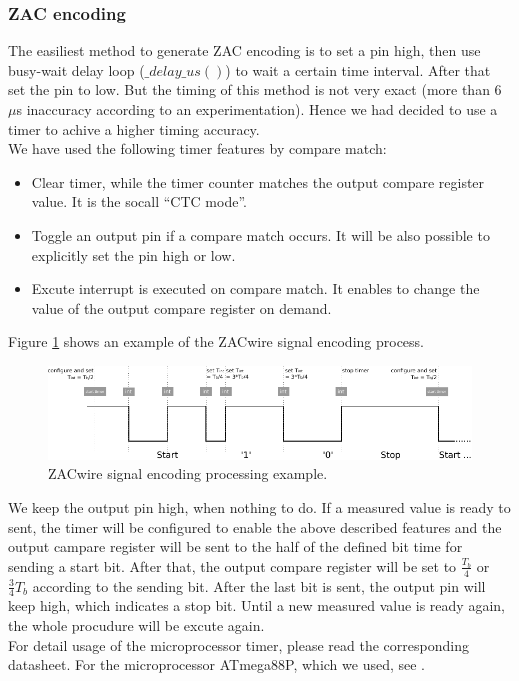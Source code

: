 \documentclass[a4paper]{scrreprt}
\begin{document}
\subsubsection{ZAC encoding}
The easiliest method to generate ZAC encoding is to set a pin high, then use busy-wait delay loop ($\_delay\_us()$) to wait a certain time interval. After that set the pin to low. 
But the timing of this method is not very exact (more than 6 $\mu$s inaccuracy according to an experimentation). Hence we had decided to use a timer to achive a higher timing accuracy. \\
We have used the following timer features by compare match: 
\begin{itemize}
  \item Clear timer, while the timer counter matches the output compare register value. It is the socall ``CTC mode''.
  \item Toggle an output pin if a compare match occurs. It will be also possible to explicitly set the pin high or low.
  \item Excute interrupt is executed on compare match. It enables to change the value of the output compare register on demand.
\end{itemize}
Figure \ref{fig:zac_encoding} shows an example of the ZACwire signal encoding process.
\begin{figure}[Hh!]
	\centering
	\includegraphics[width=\textwidth]{img/zac_encoding.pdf}
	\caption{ZACwire signal encoding processing example.}
	\label{fig:zac_encoding}
\end{figure}
We keep the output pin high, when nothing to do.
If a measured value is ready to sent, the timer will be configured to enable the above described features and the output campare register will be sent to the half of the defined bit time for sending a start bit.
After that, the output compare register will be set to $\frac{T_{b}}{4}$ or $\frac{3}{4}T_{b}$ according to the sending bit.
After the last bit is sent, the output pin will keep high, which indicates a stop bit. 
Until a new measured value is ready again, the whole procudure will be excute again.
\\
For detail usage of the microprocessor timer, please read the corresponding datasheet. For the microprocessor ATmega88P, which we used, see \cite{atmega88}. 
\end{document}
